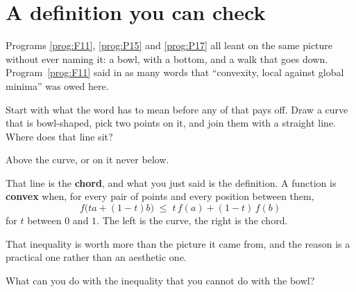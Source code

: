 \section{A definition you can check}
\label{sec:P19-chord}

\begin{fr}
Programs \ref{prog:F11}, \ref{prog:P15} and \ref{prog:P17} all leant on the
same picture without ever naming it: a bowl, with a bottom, and a walk that
goes down. Program~\ref{prog:F11} said in as many words that
\enquote{convexity, local against global minima} was owed here.

Start with what the word has to mean before any of that pays off. Draw a
curve that is bowl-shaped, pick two points on it, and join them with a
straight line. Where does that line sit?
\dotline
\nextframe
\end{fr}

\begin{fr}
\begin{ansblock}
Above the curve, or on it \dash{} never below.
\end{ansblock}

That line is the \textbf{chord}, and what you just said is the definition. A
function is \textbf{convex} when, for every pair of points and every position
between them,
\[ f\bigl(t a + (1-t)b\bigr) \;\le\; t\,f(a) + (1-t)\,f(b) \]
for $t$ between $0$ and $1$. The left is the curve, the right is the chord.

\end{fr}

\begin{fr}
That inequality is worth more than the picture it came from, and the reason is
a practical one rather than an aesthetic one.

What can you do with the inequality that you cannot do with the bowl?
\nextframe
\end{fr}

